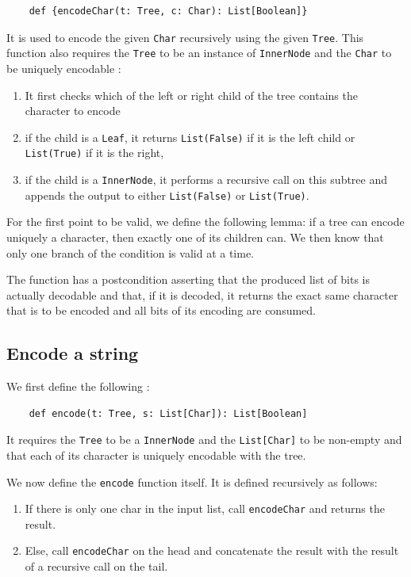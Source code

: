 \documentclass[a4paper,UKenglish,cleveref, autoref, thm-restate]{lipics-v2021}
\begin{document}
\begin{lstlisting}
    def {encodeChar(t: Tree, c: Char): List[Boolean]} 
\end{lstlisting}

It is used to encode the given \lstinline{Char} recursively using the given \lstinline{Tree}. This function also requires the \lstinline{Tree} to be an instance of \lstinline{InnerNode} 
and the \lstinline{Char} to be uniquely encodable :

\begin{enumerate}
    \item It first checks which of the left or right child of the tree contains the character to encode
    \item if the child is a \lstinline{Leaf}, it returns \lstinline{List(False)} if it is the left child or \lstinline{List(True)} if it is the right,
    \item if the child is a \lstinline{InnerNode}, it performs a recursive call on this subtree and appends the output to either \lstinline{List(False)} or \lstinline{List(True)}.
\end{enumerate}

For the first point to be valid, we define the following lemma: if a tree can encode uniquely a character, then exactly one of its children can. We then know that only one branch of the condition is valid at a time.

The function has a postcondition asserting that the produced list of bits is actually decodable and that, if it is decoded, it returns the exact same character that is to be encoded and all bits of its encoding are consumed.

\subsection{Encode a string}
We first define the following :

\begin{lstlisting}
    def encode(t: Tree, s: List[Char]): List[Boolean]
\end{lstlisting}

It requires the \lstinline{Tree} to be a \lstinline{InnerNode} and  the \lstinline{List[Char]} to be non-empty and that each of its character is uniquely encodable with the tree.

We now define the \lstinline{encode} function itself. It is defined recursively as follows:
\begin{enumerate}
    \item If there is only one char in the input list, call \lstinline{encodeChar} and returns the result.
    \item Else, call \lstinline{encodeChar} on the head and concatenate the result with the result of a recursive call on the tail.
\end{enumerate}
\end{document}
